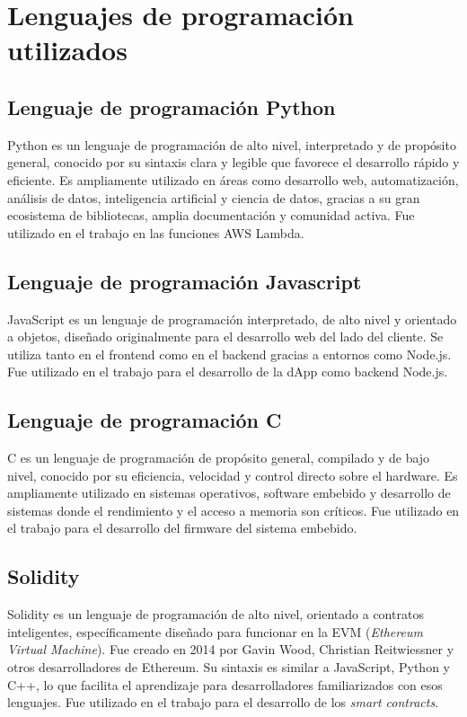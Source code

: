 \section{Lenguajes de programación utilizados}

\subsection{Lenguaje de programación Python}
Python es un lenguaje de programación de alto nivel, interpretado y de propósito general, conocido por su sintaxis clara y legible que favorece el desarrollo rápido y eficiente. Es ampliamente utilizado en áreas como desarrollo web, automatización, análisis de datos, inteligencia artificial y ciencia de datos, gracias a su gran ecosistema de bibliotecas, amplia documentación y comunidad activa. Fue utilizado en el trabajo en las funciones AWS Lambda.


\subsection{Lenguaje de programación Javascript}
JavaScript es un lenguaje de programación interpretado, de alto nivel y orientado a objetos, diseñado originalmente para el desarrollo web del lado del cliente. Se utiliza tanto en el frontend como en el backend gracias a entornos como Node.js. Fue utilizado en el trabajo para el desarrollo de la dApp como backend Node.js.


\subsection{Lenguaje de programación C}
C es un lenguaje de programación de propósito general, compilado y de bajo nivel, conocido por su eficiencia, velocidad y control directo sobre el hardware. Es ampliamente utilizado en sistemas operativos, software embebido y desarrollo de sistemas donde el rendimiento y el acceso a memoria son críticos. Fue utilizado en el trabajo para el desarrollo del firmware del sistema embebido.

\subsection{Solidity}

Solidity \cite{solidity} es un lenguaje de programación de alto nivel, orientado a contratos inteligentes, específicamente diseñado para funcionar en la EVM (\textit{Ethereum Virtual Machine}). Fue creado en 2014 por Gavin Wood, Christian Reitwiessner y otros desarrolladores de Ethereum. Su sintaxis es similar a JavaScript, Python y C++, lo que facilita el aprendizaje para desarrolladores familiarizados con esos lenguajes. Fue utilizado en el trabajo para el desarrollo de los \textit{smart contracts}.


